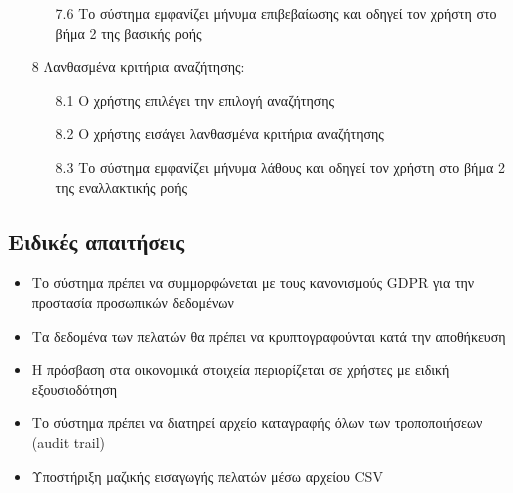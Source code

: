 \documentclass[12pt,a4paper,twoside]{book}
\begin{document}
\begin{enumerate}
\begin{enumerate}
        \item [7.6 ] Το σύστημα εμφανίζει μήνυμα επιβεβαίωσης και οδηγεί τον χρήστη στο βήμα 2 της βασικής ροής
    \end{enumerate}
  \item[8 ] Λανθασμένα κριτήρια αναζήτησης:
    \begin{enumerate}
        \item [8.1 ] Ο χρήστης επιλέγει την επιλογή αναζήτησης
        \item [8.2 ] Ο χρήστης εισάγει λανθασμένα κριτήρια αναζήτησης
        \item [8.3 ] Το σύστημα εμφανίζει μήνυμα λάθους και οδηγεί τον χρήστη στο βήμα 2 της εναλλακτικής ροής
    \end{enumerate}
\end{enumerate}

\subsection{Ειδικές απαιτήσεις}
\begin{itemize}
  \item Το σύστημα πρέπει να συμμορφώνεται με τους κανονισμούς GDPR για την προστασία προσωπικών δεδομένων
  \item Τα δεδομένα των πελατών θα πρέπει να κρυπτογραφούνται κατά την αποθήκευση
  \item Η πρόσβαση στα οικονομικά στοιχεία περιορίζεται σε χρήστες με ειδική εξουσιοδότηση
  \item Το σύστημα πρέπει να διατηρεί αρχείο καταγραφής όλων των τροποποιήσεων (audit trail)
  \item Υποστήριξη μαζικής εισαγωγής πελατών μέσω αρχείου CSV
\end{itemize}
\end{document}
